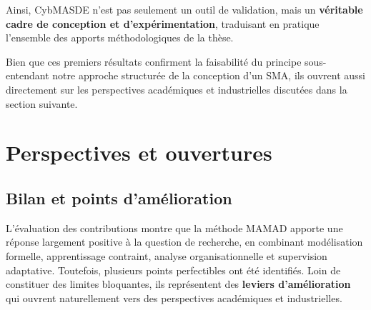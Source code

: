 Ainsi, CybMASDE n’est pas seulement un outil de validation, mais un \textbf{véritable cadre de conception et d’expérimentation}, traduisant en pratique l’ensemble des apports méthodologiques de la thèse.


\noindent
Bien que ces premiers résultats confirment la faisabilité du principe sous-entendant notre approche structurée de la conception d'un SMA, ils ouvrent aussi directement sur les perspectives académiques et industrielles discutées dans la section suivante.

\section*{Perspectives et ouvertures}
\label{sec:perspectives}

\subsection*{Bilan et points d’amélioration}

L’évaluation des contributions montre que la méthode \ac{MAMAD} apporte une réponse largement positive à la question de recherche, en combinant modélisation formelle, apprentissage contraint, analyse organisationnelle et supervision adaptative.
Toutefois, plusieurs points perfectibles ont été identifiés. Loin de constituer des limites bloquantes, ils représentent des \textbf{leviers d’amélioration} qui ouvrent naturellement vers des perspectives académiques et industrielles.

